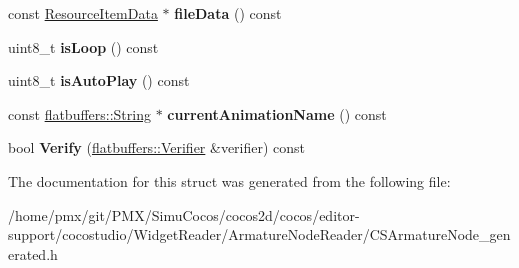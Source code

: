 \begin{DoxyCompactItemize}
const \hyperlink{structflatbuffers_1_1ResourceItemData}{Resource\+Item\+Data} $\ast$ {\bfseries file\+Data} () const
\item 
\mbox{\label{structflatbuffers_1_1CSArmatureNodeOption_a4f02f3db8432f00624211e4a3588b159}} 
uint8\+\_\+t {\bfseries is\+Loop} () const
\item 
\mbox{\label{structflatbuffers_1_1CSArmatureNodeOption_a200535f0872badb37b896165d79a81b8}} 
uint8\+\_\+t {\bfseries is\+Auto\+Play} () const
\item 
\mbox{\label{structflatbuffers_1_1CSArmatureNodeOption_af14c26422768d18c6fc4d8ec3fff66df}} 
const \hyperlink{structflatbuffers_1_1String}{flatbuffers\+::\+String} $\ast$ {\bfseries current\+Animation\+Name} () const
\item 
\mbox{\label{structflatbuffers_1_1CSArmatureNodeOption_aba5b855937c8c594dff1ea48eae6f0ae}} 
bool {\bfseries Verify} (\hyperlink{classflatbuffers_1_1Verifier}{flatbuffers\+::\+Verifier} \&verifier) const
\end{DoxyCompactItemize}


The documentation for this struct was generated from the following file\+:\begin{DoxyCompactItemize}
\item 
/home/pmx/git/\+P\+M\+X/\+Simu\+Cocos/cocos2d/cocos/editor-\/support/cocostudio/\+Widget\+Reader/\+Armature\+Node\+Reader/C\+S\+Armature\+Node\+\_\+generated.\+h\end{DoxyCompactItemize}

